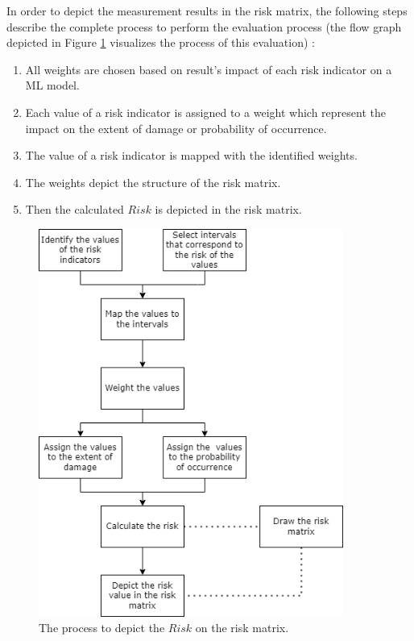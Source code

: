 In order to depict the measurement results in the risk matrix, the following steps describe the complete process to perform the evaluation process (the flow graph depicted in Figure \ref{fig:flow_graph} visualizes the process of this evaluation) \cite{DBLP:journals/corr/abs-2012-04884}:

\begin{enumerate}
  \item All weights are chosen based on result's impact of each risk indicator on a ML model.
  \item Each value of a risk indicator is assigned to a weight which represent the impact on the extent of damage or probability of occurrence.
  \item The value of a risk indicator is mapped with the identified weights.
  \item The weights depict the structure of the risk matrix.
  \item Then the calculated $Risk$ is depicted in the risk matrix.
\end{enumerate}

\begin{figure}[h!]
  \centering
  \includegraphics[width=10cm]{pictures/flow_graph.png}
  \caption{The process to depict the $Risk$ on the risk matrix.}
  \label{fig:flow_graph}
\end{figure}

